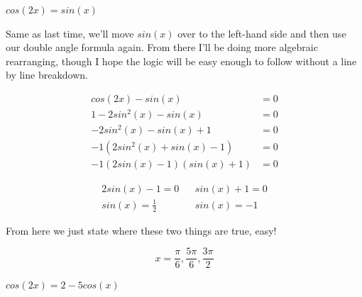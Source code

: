 \documentclass[10pt,letterpaper]{amspset}
\begin{document}
\pagebreak


\begin{problem}[22]
    $cos(2x) = sin(x)$
\end{problem}

\begin{solution}
    Same as last time, we'll move $sin(x)$ over to the left-hand side and then use our double angle formula again. From there I'll be doing more algebraic rearranging, though I hope the logic will be easy enough to follow without a line by line breakdown. 
    
    \begin{align}
        cos(2x) - sin(x) &= 0 \\
        1 - 2sin^2(x) - sin(x) &= 0 \\
        -2sin^2(x) - sin(x) + 1 &= 0 \\
        -1 (2sin^2(x) + sin(x) - 1) &= 0 \\
        -1(2sin(x) - 1)(sin(x) + 1) &= 0
    \end{align}
    
    \begin{align}
        2 sin(x) - 1 = 0 && sin(x) + 1 = 0 \\
        sin(x) = \frac{1}{2} && sin(x) = -1
    \end{align}
    
    From here we just state where these two things are true, easy! 
    
    \[\boxed{ x = \frac{\pi}{6}, \frac{5\pi}{6}, \frac{3\pi}{2}  }\]
\end{solution}


\begin{problem}[24]
    $cos(2x) = 2 - 5cos(x)$
\end{problem}
\end{document}
